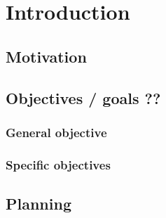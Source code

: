 

\chapter{Introduction}

\section{Motivation}

\section{Objectives / goals ??}

\subsection{General objective}

\subsection{Specific objectives}

\section{Planning}
